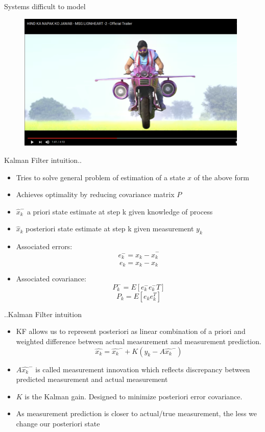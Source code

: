 \documentclass{beamer}
\begin{document}
\begin{frame}{Systems difficult to model}
  \begin{figure} [ht!]
    \includegraphics[width=110mm]{images/msg3.png}
  \end{figure}
\vskip 1cm
\end{frame}
\begin{frame}{Kalman Filter intuition..}
\begin{itemize}
  \item Tries to solve general problem of estimation of a state \(x\) of the above form
  \item Achieves optimality by reducing covariance matrix \(P\)
  \item \(\hat{x}_k^- \) a priori state estimate at step k given knowledge of process
  \item \(\hat{x}_k\) posteriori state estimate  at step k given measurement \(y_k\)
  \item Associated errors:
    \[ e_k^- = x_k - \hat{x}_k^- \]
    \[ e_k   = x_k - \hat{x}_k \]
  \item Associated covariance:
    \[ P_k^- = E[e_k^-e_k^-T] \]
    \[ P_k   = E[e_k e_k^T] \]
\end{itemize}
\vskip 1cm
\end{frame}
\begin{frame}{..Kalman Filter intuition}
\begin{itemize}
  \item KF allows us to represent posteriori as linear combination of a priori and weighted difference between actual measurement and measurement prediction.
   \[
     \hat{x_k} = \hat{x_k}^- + K (y_k - A\hat{x_k}^-)
    \]
   \item \(A\hat{x_k}^-\) is called measurement innovation which reflects discrepancy between predicted measurement and actual measurement
   \item \(K\) is the Kalman gain. Designed to minimize posteriori error covariance.
   \item As measurement prediction is closer to actual/true measurement, the less we change our posteriori state
\end{itemize}
\vskip 1cm
\end{frame}
\end{document}
